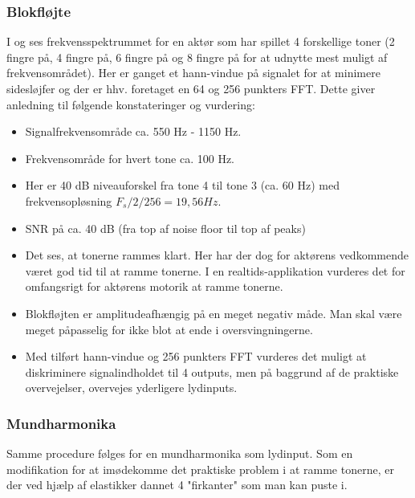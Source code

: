 {\subsubsection{Blokfløjte}\label{subsubsec:Styringsenhed:analyse:Mundharmonika}


I  og  ses frekvensspektrummet for en aktør som har spillet 4 forskellige toner (2 fingre på, 4 fingre på, 6 fingre på og 8 fingre på for at udnytte mest muligt af frekvensområdet). Her er ganget et hann-vindue på signalet for at minimere sidesløjfer og der er hhv. foretaget en 64 og 256 punkters FFT. Dette giver anledning til følgende konstateringer og vurdering:
\begin{itemize}
    \item Signalfrekvensområde ca. 550 Hz - 1150 Hz.
    \item Frekvensområde for hvert tone ca. 100 Hz.
    \item Her er 40 dB niveauforskel fra tone 4 til tone 3 (ca. 60 Hz) med frekvensopløsning $F_s/2/256 = 19,56 Hz$.
    \item SNR på ca. 40 dB (fra top af noise floor til top af peaks)
    \item Det ses, at tonerne rammes klart. Her har der dog for aktørens vedkommende været god tid til at ramme tonerne. I en realtids-applikation vurderes det for omfangsrigt for aktørens motorik at ramme tonerne.
    \item Blokfløjten er amplitudeafhængig på en meget negativ måde. Man skal være meget påpasselig for ikke blot at ende i oversvingningerne.
    \item Med tilført hann-vindue og 256 punkters FFT vurderes det muligt at diskriminere signalindholdet til 4 outputs, men på baggrund af de praktiske overvejelser, overvejes yderligere lydinputs. 
\end{itemize}

\subsubsection{Mundharmonika}
Samme procedure følges for en mundharmonika som lydinput. Som en modifikation for at imødekomme det praktiske problem i at ramme tonerne, er der ved hjælp af elastikker dannet 4 "firkanter" som man kan puste i. 

}
